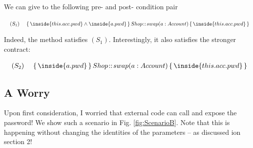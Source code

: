 We can give to    the following pre- and post- condition pair

	$\strut \ \ \ (S_1) \ \ \ \ %
					 {\mprepostLong 
					 {\inside {this.acc.pwd} \wedge \inside{a.pwd}}
					 {Shop}
					 {swap}
					 {a:Account}
					{\inside {this.acc.pwd}}
					}$
	
Indeed, the method  satisfies $(S_1)$.
Interestingly, it also satisfies the stronger contract:

$\strut \ \ \ (S_2) \ \ \ \ %
					 {\mprepostLong 
					 {\inside{a.pwd}}
					 {Shop}
					 {swap}
					 {a:Account}
					{\inside {this.acc.pwd}}
					}$



\subsection{A Worry}

Upon first consideration, I worried that external code can call  and expose the password! We show such a scenario in Fig. \ref{fig:ScenarioB}. 
Note that this is happening without changing the identities of the parameters -- as discussed ion section 2!

